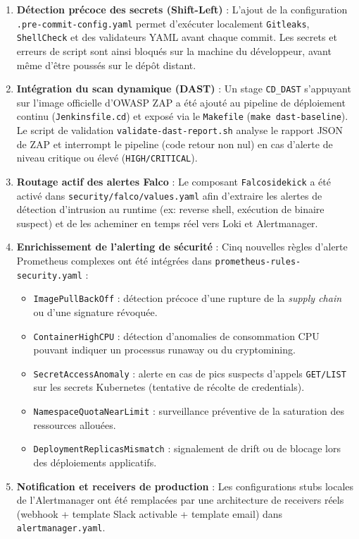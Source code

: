 \begin{enumerate}
  \item \textbf{Détection précoce des secrets (Shift-Left)} : L'ajout de la configuration \texttt{.pre-commit-config.yaml} permet d'exécuter localement \texttt{Gitleaks}, \texttt{ShellCheck} et des validateurs YAML avant chaque commit. Les secrets et erreurs de script sont ainsi bloqués sur la machine du développeur, avant même d'être poussés sur le dépôt distant.
  \item \textbf{Intégration du scan dynamique (DAST)} : Un stage \texttt{CD\_DAST} s'appuyant sur l'image officielle d'OWASP ZAP a été ajouté au pipeline de déploiement continu (\texttt{Jenkinsfile.cd}) et exposé via le \texttt{Makefile} (\texttt{make dast-baseline}). Le script de validation \texttt{validate-dast-report.sh} analyse le rapport JSON de ZAP et interrompt le pipeline (code retour non nul) en cas d'alerte de niveau critique ou élevé (\texttt{HIGH/CRITICAL}).
  \item \textbf{Routage actif des alertes Falco} : Le composant \texttt{Falcosidekick} a été activé dans \texttt{security/falco/values.yaml} afin d'extraire les alertes de détection d'intrusion au runtime (ex: reverse shell, exécution de binaire suspect) et de les acheminer en temps réel vers Loki et Alertmanager.
  \item \textbf{Enrichissement de l'alerting de sécurité} : Cinq nouvelles règles d'alerte Prometheus complexes ont été intégrées dans \texttt{prometheus-rules-security.yaml} :
  \begin{itemize}
    \item \texttt{ImagePullBackOff} : détection précoce d'une rupture de la \textit{supply chain} ou d'une signature révoquée.
    \item \texttt{ContainerHighCPU} : détection d'anomalies de consommation CPU pouvant indiquer un processus runaway ou du cryptomining.
    \item \texttt{SecretAccessAnomaly} : alerte en cas de pics suspects d'appels \texttt{GET/LIST} sur les secrets Kubernetes (tentative de récolte de credentials).
    \item \texttt{NamespaceQuotaNearLimit} : surveillance préventive de la saturation des ressources allouées.
    \item \texttt{DeploymentReplicasMismatch} : signalement de drift ou de blocage lors des déploiements applicatifs.
  \end{itemize}
  \item \textbf{Notification et receivers de production} : Les configurations stubs locales de l'Alertmanager ont été remplacées par une architecture de receivers réels (webhook + template Slack activable + template email) dans \texttt{alertmanager.yaml}.
\end{enumerate}

